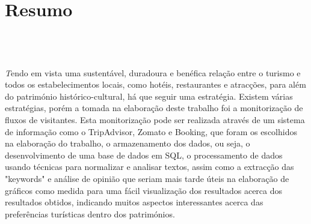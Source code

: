 \chapter{Resumo}
\section*{\textit{\TITULO}\\  {\small{\textit{\SUBTITULO}}}}


\textit
Tendo em vista uma sustentável, duradoura e benéfica relação entre o turismo e todos os estabelecimentos locais, como hotéis, restaurantes e atracções, para além do património histórico-cultural, há que seguir uma estratégia. Existem várias estratégias, porém a tomada na elaboração deste trabalho foi a monitorização de fluxos de visitantes. Esta monitorização pode ser realizada através de um sistema de informação como o TripAdvisor, Zomato e Booking, que foram os escolhidos na elaboração do trabalho, o armazenamento dos dados, ou seja, o desenvolvimento de uma base de dados em SQL, o processamento de dados usando técnicas para normalizar e analisar textos, assim como a extracção das "keywords" e análise de opinião que seriam mais tarde úteis na elaboração de gráficos como medida para uma fácil visualização dos resultados acerca dos resultados obtidos, indicando muitos aspectos interessantes acerca das preferências turísticas dentro dos patrimónios.
